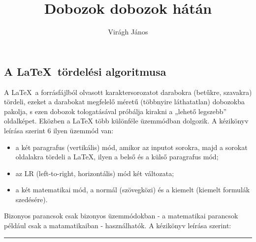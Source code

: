 \documentclass{article}
\title{Dobozok dobozok hátán}
\author{Virágh János}
\begin{document}
\maketitle

\subsection*{A \LaTeX\ tördelési algoritmusa}

A \LaTeX\ a forrásfájlból olvasott karaktersorozatot darabokra (betűkre, szavakra) tördeli, ezeket a darabokat megfelelő méretű (többnyire láthatatlan) dobozokba pakolja, s ezen dobozok tologatásával próbálja kirakni a „lehető legszebb” oldalképet. Eközben a \LaTeX{} több különféle üzemmódban dolgozik. A kézikönyv leírása szerint 6 ilyen üzemmód van:
\begin{itemize}
\item a két paragrafus (vertikális) mód, amikor az inputot sorokra, majd a sorokat oldalakra tördeli a \LaTeX{}, ilyen a belső és a külső paragrafus mód;
\item az LR (left-to-right, horizontális) mód két változata;
\item a két matematikai mód, a normál (szövegközi) és a kiemelt (kiemelt formulák szedésére).
\end{itemize}
Bizonyos parancsok csak  bizonyos üzemmódokban - a matematikai parancsok például csak a matamatikaiban - használhatók. A kézikönyv leírása szerint:
\noindent\rule{\linewidth}{1pt}
\end{document}
